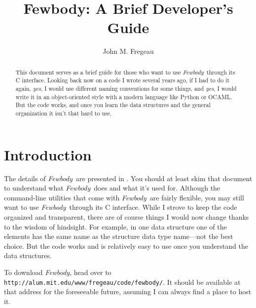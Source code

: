 \documentclass[10pt,preprint]{aastex} %
\newcommand{\Fewbody}{{\em Fewbody\/}}
\begin{document}
\title{Fewbody: A Brief Developer's Guide}
\author{John M. Fregeau}

\begin{abstract}
This document serves as a brief guide for those who want to use \Fewbody\ through
its C interface.  Looking back now on a code I wrote several years ago, if I had
to do it again, {\em yes}, I would use different naming conventions for some things, 
and {\em yes}, I would write it in an object-oriented style with a modern language 
like Python or OCAML.  But the code works, and once you learn the data structures and 
the general organization it isn't that hard to use.
\end{abstract}


\section{Introduction}\label{sec:introduction}
The details of \Fewbody\ are presented in \citet{2004MNRAS.352....1F}.  You should
at least skim that document to understand what \Fewbody\ does and what it's used for.
Although the command-line utilities that come with \Fewbody\ are fairly flexible,
you may still want to use \Fewbody\ through its C interface.  While I strove to
keep the code organized and transparent, there are of course things I would now change
thanks to the wisdom of hindsight.  For example, in one data structure one of the elements
has the same name as the structure data type name---not the best choice.  But the code works
and is relatively easy to use once you understand the data structures.

To download \Fewbody, head over to {\tt http://alum.mit.edu/www/fregeau/code/fewbody/}.
It should be available at that address for the foreseeable future, assuming I can always
find a place to host it.

\end{document}
